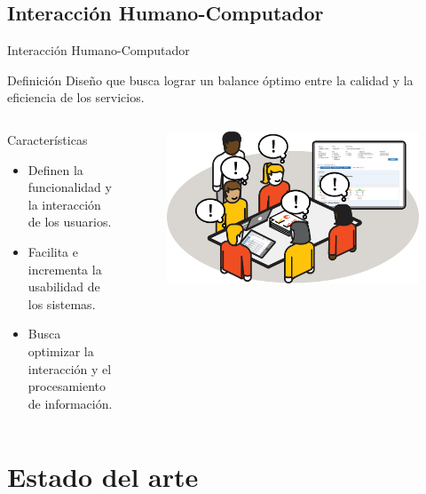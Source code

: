 \documentclass[10pt,xcolor=table]{beamer}
\begin{document}
\subsection{Interacción Humano-Computador}
\begin{frame}{Interacción Humano-Computador}
	\begin{alertblock}{Definición}
		Diseño que busca lograr un balance óptimo entre la calidad y la eficiencia de los servicios.
	\end{alertblock}

	\begin{columns}[c,onlytextwidth]
		\begin{block}{Características}
			\begin{itemize}
	        	\item Definen la funcionalidad y la interacción de los usuarios.
	        	\item Facilita e incrementa la usabilidad de los sistemas.
	        	\item Busca optimizar la interacción y el procesamiento de información.
	    	\end{itemize}
		\end{block}
		\begin{figure}
		    \includegraphics[scale=0.12]{../Figuras/happy_agile}
		\end{figure}
  	\end{columns}
\end{frame}

\section{Estado del arte}
\end{document}
